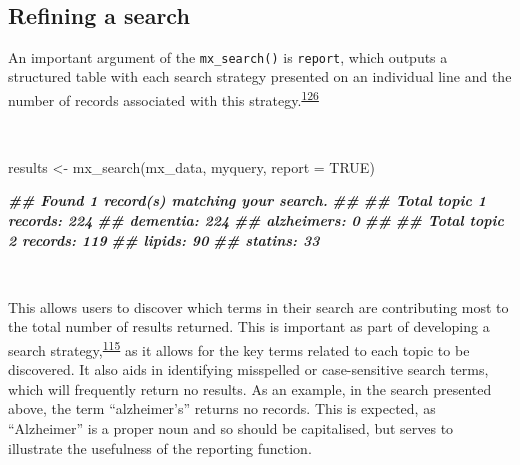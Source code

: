 \documentclass[a4paper, twoside]{templates/ociamthesis}
\newenvironment{Shaded}{\begin{snugshade}}{\end{snugshade}}
\newcommand{\AttributeTok}[1]{\textcolor[rgb]{0.77,0.63,0.00}{#1}}
\newcommand{\ConstantTok}[1]{\textcolor[rgb]{0.00,0.00,0.00}{#1}}
\newcommand{\DocumentationTok}[1]{\textcolor[rgb]{0.56,0.35,0.01}{\textbf{\textit{#1}}}}
\newcommand{\FunctionTok}[1]{\textcolor[rgb]{0.00,0.00,0.00}{#1}}
\newcommand{\NormalTok}[1]{#1}
\newcommand{\OtherTok}[1]{\textcolor[rgb]{0.56,0.35,0.01}{#1}}
\renewenvironment{Shaded}
{
  \vspace{4pt}%
  \begin{snugshade}%
}{%
  \end{snugshade}%
  \vspace{4pt}%
}
\begin{document}
~

\hypertarget{refining-a-search}{%
\subsection{Refining a search}\label{refining-a-search}}

An important argument of the \texttt{mx\_search()} is \texttt{report}, which outputs a structured table with each search strategy presented on an individual line and the number of records associated with this strategy.\textsuperscript{\protect\hyperlink{ref-rethlefsen2021prisma}{126}}

~

\begin{Shaded}
\begin{Highlighting}[]
\NormalTok{results  }\OtherTok{\textless{}{-}} \FunctionTok{mx\_search}\NormalTok{(mx\_data,}
\NormalTok{                      myquery,}
                      \AttributeTok{report =} \ConstantTok{TRUE}\NormalTok{)}
\end{Highlighting}
\end{Shaded}

\begin{Shaded}
\begin{Highlighting}[]
\DocumentationTok{\#\# Found 1 record(s) matching your search.}
\DocumentationTok{\#\# }
\DocumentationTok{\#\# Total topic 1 records: 224}
\DocumentationTok{\#\# dementia: 224}
\DocumentationTok{\#\# alzheimer\textquotesingle{}s: 0}
\DocumentationTok{\#\# }
\DocumentationTok{\#\# Total topic 2 records: 119}
\DocumentationTok{\#\# lipids: 90}
\DocumentationTok{\#\# statins: 33}
\end{Highlighting}
\end{Shaded}

~

This allows users to discover which terms in their search are contributing most to the total number of results returned. This is important as part of developing a search strategy,\textsuperscript{\protect\hyperlink{ref-bramer2018}{115}} as it allows for the key terms related to each topic to be discovered. It also aids in identifying misspelled or case-sensitive search terms, which will frequently return no results. As an example, in the search presented above, the term ``alzheimer's'' returns no records. This is expected, as ``Alzheimer'' is a proper noun and so should be capitalised, but serves to illustrate the usefulness of the reporting function.

~
\end{document}
